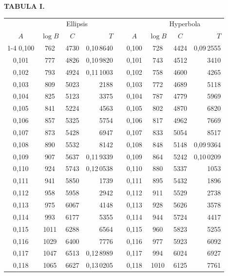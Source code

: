 \endgroup
\clearpage
{}
\begingroup
\centering
\fontsize{9}{9}\selectfont
\setlength{\tabcolsep}{6pt}
\renewcommand{\arraystretch}{1}
\setlength{\parskip}{0pt}
\textbf{TABULA I.}
\par\vspace{7pt}
\begin{tabular}{|c|c|c|r|@{}p{9pt}@{}|c|c|c|r|}
\hline
 & \multicolumn{3}{c|}{Ellipsis} & & & \multicolumn{3}{c|}{Hyperbola} \\
\(A\) & \(\log B\) & \(C\) & \(T\) & & \(A\) & \(\log B\) & \(C\) & \(T\) \\
\cline{1-4}\cline{6-9}
0,100 & 762 & 4730 & 0,10\,8640 &  & 0,100 & 728 & 4424 & 0,09\,2555 \\
0,101 & 777 & 4826 & 0,10\,9820 &  & 0,101 & 743 & 4512 & 3410 \\
0,102 & 793 & 4924 & 0,11\,1003 &  & 0,102 & 758 & 4600 & 4265 \\
0,103 & 809 & 5023 & 2188 &  & 0,103 & 772 & 4689 & 5118 \\
0,104 & 825 & 5123 & 3375 &  & 0,104 & 787 & 4779 & 5969 \\
0,105 & 841 & 5224 & 4563 &  & 0,105 & 802 & 4870 & 6820 \\[3pt]
0,106 & 857 & 5325 & 5754 &  & 0,106 & 817 & 4962 & 7669 \\
0,107 & 873 & 5428 & 6947 &  & 0,107 & 833 & 5054 & 8517 \\
0,108 & 890 & 5532 & 8142 &  & 0,108 & 848 & 5148 & 0,09\,9364 \\
0,109 & 907 & 5637 & 0,11\,9339 &  & 0,109 & 864 & 5242 & 0,10\,0209 \\
0,110 & 924 & 5743 & 0,12\,0538 &  & 0,110 & 880 & 5337 & 1053 \\[3pt]
0,111 & 941 & 5850 & 1739 &  & 0,111 & 895 & 5432 & 1896 \\
0,112 & 958 & 5958 & 2942 &  & 0,112 & 911 & 5529 & 2738 \\
0,113 & 975 & 6067 & 4148 &  & 0,113 & 928 & 5626 & 3578 \\
0,114 & 993 & 6177 & 5355 &  & 0,114 & 944 & 5724 & 4417 \\
0,115 & 1011 & 6288 & 6564 &  & 0,115 & 960 & 5823 & 5255 \\[3pt]
0,116 & 1029 & 6400 & 7776 &  & 0,116 & 977 & 5923 & 6092 \\
0,117 & 1047 & 6513 & 0,12\,8989 &  & 0,117 & 994 & 6024 & 6927 \\
0,118 & 1065 & 6627 & 0,13\,0205 &  & 0,118 & 1010 & 6125 & 7761 \\

\end{tabular}
